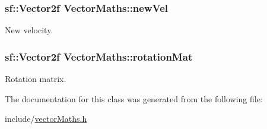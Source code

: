 \subsubsection[{\texorpdfstring{new\+Vel}{newVel}}]{\setlength{\rightskip}{0pt plus 5cm}sf\+::\+Vector2f Vector\+Maths\+::new\+Vel\hspace{0.3cm}{\ttfamily [private]}}\hypertarget{class_vector_maths_a00513ada0f74184f044eb6fc35aa4a85}{}\label{class_vector_maths_a00513ada0f74184f044eb6fc35aa4a85}
New velocity. 
\subsubsection[{\texorpdfstring{rotation\+Mat}{rotationMat}}]{\setlength{\rightskip}{0pt plus 5cm}sf\+::\+Vector2f Vector\+Maths\+::rotation\+Mat\hspace{0.3cm}{\ttfamily [private]}}\hypertarget{class_vector_maths_ae07f69982afee9ac9532c70e4bcde1d3}{}\label{class_vector_maths_ae07f69982afee9ac9532c70e4bcde1d3}
Rotation matrix. 

The documentation for this class was generated from the following file\+:\begin{DoxyCompactItemize}
\item 
include/\hyperlink{vector_maths_8h}{vector\+Maths.\+h}\end{DoxyCompactItemize}
